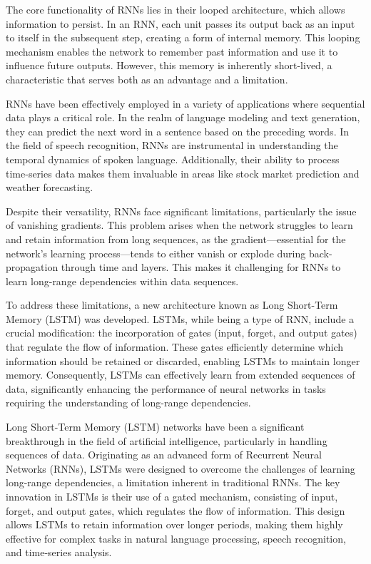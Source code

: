 The core functionality of RNNs lies in their looped architecture, which allows information to persist. In an RNN, each unit passes its output back as an input to itself in the subsequent step, creating a form of internal memory. This looping mechanism enables the network to remember past information and use it to influence future outputs. However, this memory is inherently short-lived, a characteristic that serves both as an advantage and a limitation.

RNNs have been effectively employed in a variety of applications where sequential data plays a critical role. In the realm of language modeling and text generation, they can predict the next word in a sentence based on the preceding words. In the field of speech recognition, RNNs are instrumental in understanding the temporal dynamics of spoken language. Additionally, their ability to process time-series data makes them invaluable in areas like stock market prediction and weather forecasting.

Despite their versatility, RNNs face significant limitations, particularly the issue of vanishing gradients. This problem arises when the network struggles to learn and retain information from long sequences, as the gradient—essential for the network's learning process—tends to either vanish or explode during back-propagation through time and layers. This makes it challenging for RNNs to learn long-range dependencies within data sequences.

To address these limitations, a new architecture known as Long Short-Term Memory (LSTM) was developed. LSTMs, while being a type of RNN, include a crucial modification: the incorporation of gates (input, forget, and output gates) that regulate the flow of information. These gates efficiently determine which information should be retained or discarded, enabling LSTMs to maintain longer memory. Consequently, LSTMs can effectively learn from extended sequences of data, significantly enhancing the performance of neural networks in tasks requiring the understanding of long-range dependencies.

Long Short-Term Memory (LSTM) networks have been a significant breakthrough in the field of artificial intelligence, particularly in handling sequences of data. Originating as an advanced form of Recurrent Neural Networks (RNNs), LSTMs were designed to overcome the challenges of learning long-range dependencies, a limitation inherent in traditional RNNs. The key innovation in LSTMs is their use of a gated mechanism, consisting of input, forget, and output gates, which regulates the flow of information. This design allows LSTMs to retain information over longer periods, making them highly effective for complex tasks in natural language processing, speech recognition, and time-series analysis.

